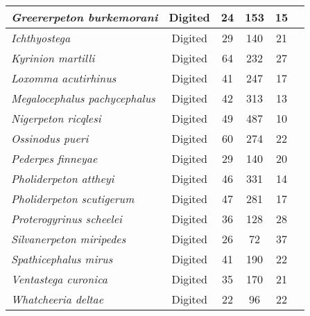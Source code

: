 \begin{tabular}{|L{4.5cm}|c|c|c|c|L{4.5cm}|}
\textit{Greererpeton burkemorani}&Digited&24&153&15&\\\hline
\textit{Ichthyostega}&Digited&29&140&21&\\\hline
\textit{Kyrinion martilli}&Digited&64&232&27&\\\hline
\textit{Loxomma acutirhinus}&Digited&41&247&17&\\\hline
\textit{Megalocephalus pachycephalus}&Digited&42&313&13&\\\hline
\textit{Nigerpeton ricqlesi}&Digited&49&487&10&\\\hline
\textit{Ossinodus pueri}&Digited&60&274&22&\\\hline
\textit{Pederpes finneyae}&Digited&29&140&20&\\\hline
\textit{Pholiderpeton attheyi}&Digited&46&331&14&\\\hline
\textit{Pholiderpeton scutigerum}&Digited&47&281&17&\\\hline
\textit{Proterogyrinus scheelei}&Digited&36&128&28&\\\hline
\textit{Silvanerpeton miripedes}&Digited&26&72&37&\\\hline
\textit{Spathicephalus mirus}&Digited&41&190&22&\\\hline
\textit{Ventastega curonica}&Digited&35&170&21&\\\hline
\textit{Whatcheeria deltae}&Digited&22&96&22&\\\hline
\end{tabular}
